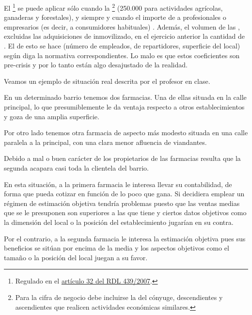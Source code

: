 \documentclass[nochap,palatino,shortheader]{apuntes}
\begin{document}
El \footnote{Regulado en el \href{https://www.boe.es/buscar/act.php?id=BOE-A-2007-6820}{artículo 32 del RDL 439/2007}.} se puede aplicar sólo cuando la \footnote{Para la cifra de negocio debe incluirse la del cónyuge, descendientes y ascendientes que realicen actividades económicas similares.}  (250.000 para actividades agrícolas, ganaderas y forestales), y siempre y cuando el importe de  a profesionales o empresarios (es decir, a consumidores habituales) . 
Además, el volumen de las , excluidas las adquisiciones de inmovilizado, en el ejercicio anterior  la cantidad de .
El  de esto se hace  (número de empleados, de repartidores, superficie del local) según diga la normativa correspondientes. 
Lo malo es que estos coeficientes son pre-crisis y por lo tanto están algo desajustado de la realidad.%

\begin{example}
Veamos un ejemplo de situación real descrita por el profesor en clase.

En un determinado barrio tenemos dos farmacias. Una de ellas situada en la calle principal, lo que presumiblemente le da ventaja respecto a otros establecimientos y goza de una amplia superficie.

Por otro lado tenemos otra farmacia de aspecto más modesto situada en una calle paralela a la principal, con una clara menor afluencia de viandantes.

Debido a mal o buen carácter de los propietarios de las farmacias resulta que la segunda acapara casi toda la clientela del barrio.

En esta situación, a la primera farmacia le interesa llevar su contabilidad, de forma que pueda cotizar en función de lo poco que gana. Si decidiera emplear un régimen de estimación objetiva tendría problemas puesto que las ventas medias que se le presuponen son superiores a las que tiene y ciertos datos objetivos como la dimensión del local o la posición del establecimiento jugarían en su contra.

Por el contrario, a la segunda farmacia le interesa la estimación objetiva pues sus beneficios se sitúan por encima de la media y los aspectos objetivos como el tamaño o la posición del local juegan a su favor.
\end{example}
\end{document}
